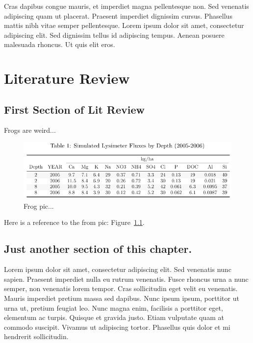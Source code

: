 \documentclass[double,12pt]{beavtex}
\begin{document}
Cras dapibus congue mauris, et imperdiet magna pellentesque non. Sed venenatis adipiscing quam ut placerat. Praesent imperdiet dignissim cursus. Phasellus mattis nibh vitae semper pellentesque. Lorem ipsum dolor sit amet, consectetur adipiscing elit. Sed dignissim tellus id adipiscing tempus. Aenean posuere malesuada rhoncus. Ut quis elit eros.




\chapter{Literature Review}

\section{First Section of Lit Review}

Frogs are weird...

\begin{figure}[ht!]
\begin{center}
	\includegraphics[width=20cm]{Images/LN_SED/Base/test.pdf}
	\caption{Frog pic...}
	\label{fig:frog}
	\end{center}
\end{figure}


Here is a reference to the from pic: Figure~\ref{fig:frog}.

\section{Just another section of this chapter.}

Lorem ipsum dolor sit amet, consectetur adipiscing elit. Sed venenatis nunc sapien. Praesent imperdiet nulla eu rutrum venenatis. Fusce rhoncus urna a nunc semper, non venenatis lorem tempor. Cras sollicitudin eget velit eu venenatis. Mauris imperdiet pretium massa sed dapibus. Nunc ipsum ipsum, porttitor ut urna ut, pretium feugiat leo. Nunc magna enim, facilisis a porttitor eget, elementum ac turpis. Quisque et gravida justo. Etiam vulputate quam at commodo suscipit. Vivamus ut adipiscing tortor. Phasellus quis dolor et mi hendrerit sollicitudin. 
\end{document}
